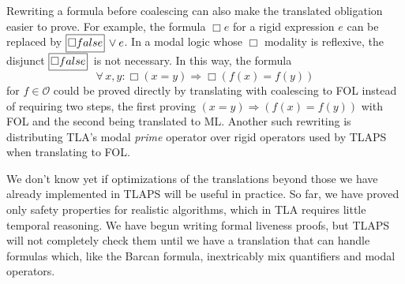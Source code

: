 \documentclass{easychair}
\renewcommand{\implies}{\Rightarrow}
\newcommand{\OO}{\mathcal{O}}
\newcommand{\B}[1]{\framebox{\rule{0pt}{.6em}\ensuremath{\!\tlachars #1\!}}\,}
\def\llnote{\ednote{LL}}
\let\tlachars\relax
\def\A{\forall\,}
\newcommand{\FALSE}{\mbox{\sc false}}
\begin{document}
Rewriting a formula before coalescing can also make the translated
obligation easier to prove.  For example, the formula $\Box e$ for a
rigid expression $e$ can be replaced by $\B{\Box\FALSE} \lor e$.
In a modal logic whose $\Box$ modality is
reflexive, the disjunct $\B{\Box\FALSE}$ is not necessary.
In this way, the formula
\[
  \A x,y : \Box(x=y) \implies \Box(f(x) = f(y))
 \]
for $f \in \OO$ could be proved directly by
translating with coalescing to FOL instead of requiring two steps, the
first proving $(x=y) \implies (f(x)=f(y))$ with FOL and the second being
translated to ML\@.
%
Another such rewriting is distributing TLA's modal \emph{prime} operator
over rigid operators used by TLAPS when translating to FOL\@.
%

We don't know yet if optimizations of the translations beyond those we
have already implemented in TLAPS will be useful in practice.  So far,
we have proved only safety properties for realistic algorithms, which
in TLA requires little temporal reasoning.  We have begun writing
formal liveness proofs, but TLAPS will not completely check them until
we have a translation that can handle formulas which, like the Barcan
formula, inextricably mix quantifiers and modal operators.
\end{document}
